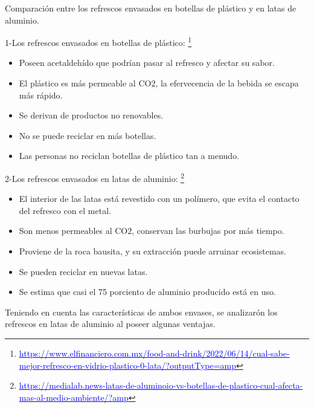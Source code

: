 \documentclass{beamer}
\begin{document}
\begin{frame}{Comparación entre los refrescos envasados en botellas de plástico y en latas de aluminio.}
   \scriptsize 

    1-Los refrescos envasados en botellas de plástico:
    \footnote{\href{https://www.elfinanciero.com.mx/food-and-drink/2022/06/14/cual-sabe-mejor-refresco-en-vidrio-plastico-0-lata/?outputType=amp}{\textcolor{blue}{https://www.elfinanciero.com.mx/food-and-drink/2022/06/14/cual-sabe-mejor-refresco-en-vidrio-plastico-0-lata/?outputType=amp}}}
    \begin{itemize}
    
  \item Poseen acetaldehído que podrían pasar al refresco y afectar su sabor.
  \item El plástico es más permeable al CO2, la efervecencia de la bebida se escapa más rápido.
  \item Se derivan de productos no renovables.
  \item No se puede reciclar en más botellas.
  \item Las personas no reciclan botellas de plástico tan a menudo.
  \end{itemize}
  2-Los refrescos envasados en latas de aluminio:
  \footnote[2]{\href{https://medialab.news-latas-de-aluminoio-vs-botellas-de-plastico-cual-afecta-mas-al-medio-ambiente/?amp}{\textcolor{blue}{https://medialab.news-latas-de-aluminoio-vs-botellas-de-plastico-cual-afecta-mas-al-medio-ambiente/?amp}}}
  \begin{itemize}
  \item El interior de las latas está revestido con un polímero, que evita el contacto del refresco con el metal.
  \item Son menos permeables al CO2, conservan las burbujas por más tiempo.
  \item Proviene de la roca bausita, y su extracción puede arruinar ecosistemas.
  \item Se pueden reciclar en nuevas latas.
  \item Se estima que casi el 75 porciento de aluminio producido está en uso.
  \end{itemize}
  
Teniendo en cuenta las características de ambos envases, se analizarón los refrescos en latas de aluminio al poseer algunas ventajas.

  
\end{frame}
\end{document}
